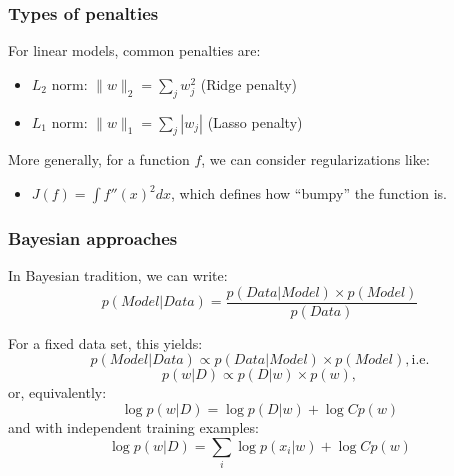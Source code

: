 \documentclass[usenames,dvipsnames]{beamer}
\begin{document}
\begin{frame}\frametitle{Types of penalties}

For linear models, common penalties are:
\begin{itemize}
\item $L_2$ norm: $\| w \|_2 = \sum_j w_j^2$ (Ridge penalty)
\item $L_1$ norm: $\| w \|_1 = \sum_j |w_j| $ (Lasso penalty)
\end{itemize}

\vspace{0.4cm}
More generally, for a function $f$, we can consider regularizations like:
\begin{itemize}
\item $J(f) = \int f''(x)^2 dx$, which defines how ``bumpy'' the function is.
\end{itemize}

\end{frame}


\begin{frame}\frametitle{Bayesian approaches}

In Bayesian tradition, we can write:
\begin{equation*}
p(Model|Data) = \frac{p(Data|Model) \times p(Model)}{p(Data)}
\end{equation*}

For a fixed data set, this yields:
\begin{equation*}
p(Model|Data) \propto p(Data|Model) \times p(Model), \text{i.e.}
\end{equation*}
\begin{equation*}
p(w|D) \propto p(D|w) \times p(w),
\end{equation*}
or, equivalently:
\begin{equation*}
\log p(w|D) = \log p(D|w) + \log C p(w)
\end{equation*}
and with independent training examples:
\begin{equation*}
\log p(w|D) = \sum_i \log p(x_i|w) + \log C p(w)
\end{equation*}

\end{frame}
\end{document}
